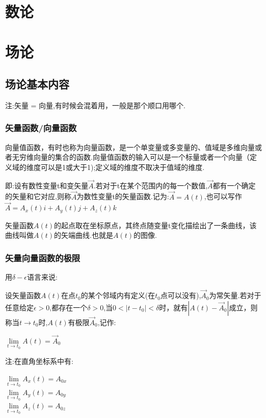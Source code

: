 \documentclass[UTF8,12pt]{ctexbook}
\newcommand{\limNormal}[1]{\lim\limits_{#1}}
\begin{document}
{{ }%

\section{数论}{

 }%

\section{场论}{

  \subsection{场论基本内容}{
    注:矢量 = 向量,有时候会混着用，一般是那个顺口用哪个.

    \subsubsection{矢量函数/向量函数}{
      向量值函数，有时也称为向量函数，是一个单变量或多变量的、值域是多维向量或者无穷维向量的集合的函数.向量值函数的输入可以是一个标量或者一个向量（定义域的维度可以是1或大于1);定义域的维度不取决于值域的维度.

      即:设有数性变量t和变矢量$\vec{A}$.若对于t在某个范围内的每一个数值,$\vec{A}$都有一个确定的矢量和它对应,则称$\vec{A}$为数性变量t的矢量函数.记为:$\vec{A} = A(t)$,也可以写作$\vec{A} = A_x(t)i + A_y(t)j + A_z(t)k$

      矢量函数$A(t)$的起点取在坐标原点，其终点随变量t变化描绘出了一条曲线，该曲线叫做$A(t)$的矢端曲线.也就是$A(t)$的图像.
    }%

    \subsubsection{矢量向量函数的极限}{
      用$\delta-\epsilon$语言来说:

      设矢量函数$A(t)$在点$t_0$的某个邻域内有定义(在$t_0$点可以没有),$\vec{A}_0$为常矢量.若对于任意给定$\epsilon > 0$,都存在一个$\delta > 0$,当$0 < |t - t_0| < \delta$时，就有$|A(t) - \vec{A}_0|$成立，则称当$t \to t_0$时,$A(t)$有极限$\vec{A}_0$,记作:

      \begin{center}
        $\limNormal{t \to t_0}A(t) = \vec{A}_0$
      \end{center}

      注:在直角坐标系中有:

      \begin{center}
        $\limNormal{t \to t_0}A_x(t) = A_{0x}$ \\
        $\limNormal{t \to t_0}A_y(t) = A_{0y}$ \\
        $\limNormal{t \to t_0}A_z(t) = A_{0z}$
      \end{center}

}}}}
\end{document}
